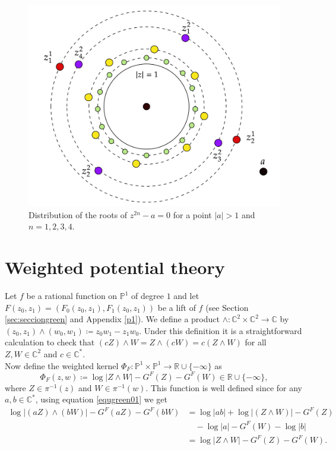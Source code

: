 \begin{figure}[h!]
	\centering  
  \includegraphics[scale=.16]{raices}
  \caption{Distribution of the roots of $z^{2n}-a =0$ for a point $|a|>1$ and $n=1,2,3,4$.}
  \label{fig:raices}
\end{figure}

\section{Weighted potential theory}\label{seccionweighted}

Let $f$ be a rational function on $\mathbb{P}^1$ of degree $1$ and let $F(z_0,z_1) = (F_0(z_0,z_1),F_1(z_0,z_1))$ be a lift of $f$ (see Section \ref{sec:secciongreen} and Appendix \ref{p1}). We define a  product $\wedge \colon \mathbb{C}^2\times \mathbb{C}^2 \rightarrow \mathbb{C}$ by $(z_0,z_1)\wedge(w_0,w_1) \coloneqq z_0 w_1 - z_1 w_0$. Under this definition it is a straightforward calculation to check that $(cZ)\wedge W = Z\wedge(cW) = c(Z\wedge W)$ for all $Z,W\in \mathbb{C}^2$ and $c\in \mathbb{C}^*$.\\
Now define the weighted kernel $\Phi_F: \mathbb{P}^1 \times \mathbb{P}^1 \rightarrow \mathbb{R}\cup\{-\infty\}$ as
$$\Phi_F(z,w) \coloneqq \log |Z\wedge W| -G^F(Z)-G^F(W) \in \mathbb{R}\cup \{-\infty\},$$
where $Z\in \pi^{-1}(z)$ and $W\in \pi^{-1}(w)$. This function is well defined since for any $a,b\in \mathbb{C}^*$, using equation \eqref{equgreen01} we get
\begin{align*}
\log |(aZ)\wedge (bW)| -G^F(aZ)-G^F(bW) &= \log|ab|+ \log|(Z \wedge W)| -G^F(Z)\\
& \quad -\log|a|-G^F(W)-\log|b|\\
&= \log |Z\wedge W| -G^F(Z)-G^F(W).
\end{align*}

